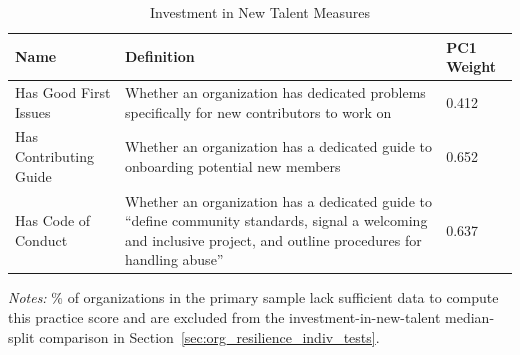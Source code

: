\begin{longtable}{>{\raggedright\arraybackslash}p{} p{}p{}}
\caption{Investment in New Talent Measures}\label{tab:investment_new_talent_metrics}\\
\toprule
\textbf{Name} & \textbf{Definition}  & \textbf{PC1 Weight} \\
\midrule
\endfirsthead




\bottomrule
\endlastfoot
Has Good First Issues & Whether an organization has dedicated problems specifically for new contributors to work on & 0.412\\
Has Contributing Guide & Whether an organization has a dedicated guide to onboarding potential new members & 0.652 \\
Has Code of Conduct & Whether an organization has a dedicated guide to ``define community standards, signal a welcoming and inclusive project, and outline procedures for handling abuse'' \citep{github_adding_2025} & 0.637 \\
\end{longtable}

\vspace{-0.5em} %
\begin{minipage}{\textwidth}
\footnotesize
\setlength{\parskip}{0pt}
\setlength{\baselineskip}{0.9\baselineskip}
\textit{Notes:} \TalentPCExcludedPct\% of organizations in the primary sample lack sufficient data to compute this practice score and are excluded from the investment-in-new-talent median-split comparison in Section~\ref{sec:org_resilience_indiv_tests}.
\end{minipage}
